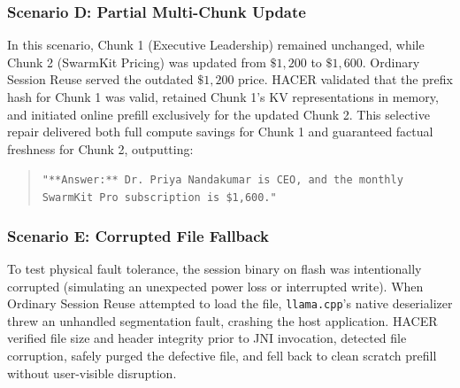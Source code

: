 \subsubsection{Scenario D: Partial Multi-Chunk Update}
In this scenario, Chunk 1 (Executive Leadership) remained unchanged, while Chunk 2 (SwarmKit Pricing) was updated from $\$1,200$ to $\$1,600$. Ordinary Session Reuse served the outdated $\$1,200$ price. HACER validated that the prefix hash for Chunk 1 was valid, retained Chunk 1's KV representations in memory, and initiated online prefill exclusively for the updated Chunk 2. This selective repair delivered both full compute savings for Chunk 1 and guaranteed factual freshness for Chunk 2, outputting:
\begin{quote}
\small
\texttt{"**Answer:** Dr. Priya Nandakumar is CEO, and the monthly SwarmKit Pro subscription is \$1,600."}
\end{quote}

\subsubsection{Scenario E: Corrupted File Fallback}
To test physical fault tolerance, the session binary on flash was intentionally corrupted (simulating an unexpected power loss or interrupted write). When Ordinary Session Reuse attempted to load the file, \texttt{llama.cpp}'s native deserializer threw an unhandled segmentation fault, crashing the host application. HACER verified file size and header integrity prior to JNI invocation, detected file corruption, safely purged the defective file, and fell back to clean scratch prefill without user-visible disruption.
